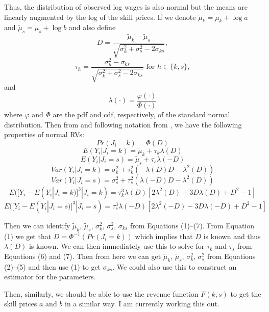 \documentclass{article}
\begin{document}
	Thus, the distribution of observed log wages is also normal but the means are linearly augmented by the log of the skill prices. If we denote $\tilde{\mu}_k = \mu_k + \log a$ and $\tilde{\mu}_s = \mu_s + \log b$ and also define 
	\begin{equation*}
		D = \frac{\tilde{\mu}_k - \tilde{\mu}_s}{\sqrt{\sigma_k^2 + \sigma_s^2 - 2\sigma_{ks}}},
	\end{equation*}
	\begin{equation*}
		\tau_h = \frac{\sigma_h^2 - \sigma_{ks}}{\sqrt{\sigma_k^2 + \sigma_s^2 - 2\sigma_{ks}}} \text{ for } h \in \{k,s\},
	\end{equation*}
	and 
	\begin{equation*}
		\lambda(\cdot) = \frac{\varphi(\cdot)}{\Phi(\cdot)}
	\end{equation*}
	where $\varphi$ and $\Phi$ are the pdf and cdf, respectively, of the standard normal distribution. Then from \citet{heckman1990empirical} and following notation from  \citet{french2011identification}, we have the following properties of normal RVs:
	\begin{equation}
		Pr(J_i = k) = \Phi(D)
	\end{equation}
	\begin{equation}
		E(Y_i | J_i = k) = \tilde{\mu}_k + \tau_k \lambda(D)
	\end{equation}
	\begin{equation}
		E(Y_i | J_i = s) = \tilde{\mu}_s + \tau_s \lambda(-D)
	\end{equation}
	\begin{equation}
		Var(Y_i | J_i = k) = \sigma_k^2 + \tau_k^2(-\lambda(D)D - \lambda^2(D))
	\end{equation}
		\begin{equation}
		Var(Y_i | J_i = s) = \sigma_s^2 + \tau_s^2(\lambda(-D)D - \lambda^2(D))
	\end{equation}
	\begin{equation}
		E([Y_i - E(Y_i|J_i = k)]^3|J_i = k) = \tau_k^3 \lambda(D)[2\lambda^2(D) + 3 D \lambda(D) + D^2 -1]
	\end{equation}
		\begin{equation}
		E([Y_i - E(Y_i|J_i = s)]^3|J_i = s) = \tau_s^3 \lambda(-D)[2\lambda^2(-D) - 3 D \lambda(-D) + D^2 -1]
	\end{equation}
	

		Then we can identify $\tilde{\mu}_k$, $\tilde{\mu}_s$, $\sigma_k^2$, $\sigma_s^2$, $\sigma_{ks}$ from Equations (1)--(7). From Equation (1) we get that $D = \Phi^{-1}(Pr(J_i=k))$ which implies that $D$ is known and thus $\lambda(D)$ is known. We can then immediately use this to solve for $\tau_k$ and $\tau_s$ from Equations (6) and (7). Then from here we can get $\tilde{\mu}_k$, $\tilde{\mu}_s$, $\sigma_k^2$, $\sigma_s^2$ from Equations (2)--(5) and then use (1) to get $\sigma_{ks}$. We could also use this to construct an estimator for the parameters.
		
		Then, similarly, we should be able to use the revenue function $F(k,s)$ to get the skill prices $a$ and $b$ in a similar way. I am currently working this out.
		
		

	
	
\end{document}
